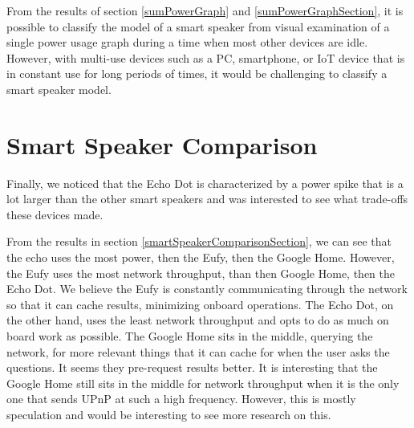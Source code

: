 From the results of section \ref{sumPowerGraph} and \ref{sumPowerGraphSection}, it is possible to classify the model of a smart speaker from visual examination of a single power usage graph during a time when most other devices are idle. However, with multi-use devices such as a PC, smartphone, or IoT device that is in constant use for long periods of times, it would be challenging to classify a smart speaker model.

\section{Smart Speaker Comparison}
Finally, we noticed that the Echo Dot is characterized by a power spike that is a lot larger than the other smart speakers and was interested to see what trade-offs these devices made.

From the results in section \ref{smartSpeakerComparisonSection}, we can see that the echo uses the most power, then the Eufy, then the Google Home. However, the Eufy uses the most network throughput, than then Google Home, then the Echo Dot. We believe the Eufy is constantly communicating through the network so that it can cache results, minimizing onboard operations. The Echo Dot, on the other hand, uses the least network throughput and opts to do as much on board work as possible. The Google Home sits in the middle, querying the network, for more relevant things that it can cache for when the user asks the questions. It seems they pre-request results better. It is interesting that the Google Home still sits in the middle for network throughput when it is the only one that sends UPnP at such a high frequency. However, this is mostly speculation and would be interesting to see more research on this.